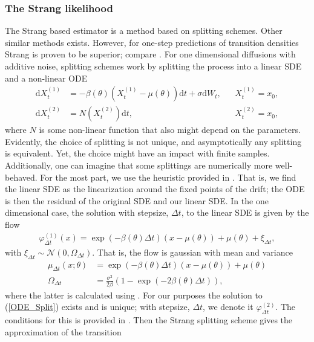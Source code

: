 \subsubsection{The Strang likelihood}
The Strang based estimator is a method based on splitting schemes. Other similar methods exists. However, for one-step predictions of transition densities Strang is proven to be superior; compare \cite[Proposition 3.4 and 3.6]{SplittingSchemes}. For one dimensional diffusions with additive noise, splitting schemes work by splitting the process into a linear SDE and a non-linear ODE
\begin{align}
    \mathrm{d}X_t^{(1)} &= -\beta(\theta)\left(X_t^{(1)} - \mu(\theta)\right)\mathrm{d}t + \sigma \mathrm{d}W_t, &&X_t^{(1)} = x_0, \\
    \mathrm{d}X_t^{(2)} &= N\left(X_t^{(2)}\right)\mathrm{d}t, &&X_t^{(2)} = x_0, \label{ODE_Split}
\end{align}
where $N$ is some non-linear function that also might depend on the parameters. Evidently, the choice of splitting is not unique, and asymptotically any splitting is equivalent. Yet, the choice might have an impact with finite samples. Additionally, one can imagine that some splittings are numerically more well-behaved. For the most part, we use the heuristic provided in \cite[section 2.3 and 2.5]{SplittingSchemes}. That is, we find the linear SDE as the linearization around the fixed points of the drift; the ODE is then the residual of the original SDE and our linear SDE. In the one dimensional case, the solution with stepsize, $\Delta t$, to the linear SDE is given by the flow
\begin{align}
    \varphi_{\Delta t}^{(1)}(x) = \exp\left(-\beta\left(\theta\right) \Delta t\right)\left(x - \mu\left(\theta\right)\right) + \mu\left(\theta\right) + \xi_{\Delta t},
\end{align}
with $\xi_{\Delta t}\sim\mathcal{N}\left(0, \Omega_{\Delta t}\right)$. That is, the flow is gaussian with mean and variance
\begin{align}
    \mu_{\Delta t}(x; \theta) &= \exp\left(-\beta\left(\theta\right) \Delta t\right)\left(x - \mu\left(\theta\right)\right) + \mu\left(\theta\right) \label{linearSDEMean}\\
    \Omega_{\Delta t} &= \frac{\sigma^2}{2\beta}\left(1 - \exp\left(-2\beta\left(\theta\right)\Delta t\right)\right), \label{linearSDEVariance}
\end{align}
where the latter is calculated using \cite[equation (6)]{SplittingSchemes}. For our purposes the solution to (\ref{ODE_Split}) exists and is unique; with stepsize, $\Delta t$, we denote it $\varphi_{\Delta t}^{(2)}$. The conditions for this is provided in \cite[Assumption (A1) and - (A2)]{SplittingSchemes}. Then the Strang splitting scheme gives the approximation of the transition
